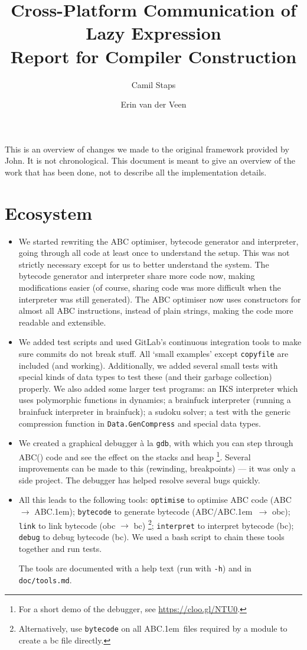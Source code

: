 \documentclass[a4paper]{article}
\title{Cross-Platform Communication of Lazy Expression\\\Large{Report for Compiler Construction}}
\author{Camil Staps \and Erin van der Veen}
\newcommand{\abcstar}{\raisebox{1pt}{$\star$}}
\newcommand{\abcs}{ABC\kern .1em\abcstar}
\begin{document}
\maketitle

This is an overview of changes we made to the original framework provided by John.
It is not chronological.
This document is meant to give an overview of the work that has been done, not to describe all the implementation details.

\section*{Ecosystem}
\begin{itemize}
	\item
		We started rewriting the ABC optimiser, bytecode generator and interpreter,
			going through all code at least once to understand the setup.
		This was not strictly necessary except for us to better understand the system.
		The bytecode generator and interpreter share more code now, making modifications easier
			(of course, sharing code was more difficult when the interpreter was still generated).
		The ABC optimiser now uses constructors for almost all ABC instructions, instead of plain strings,
			making the code more readable and extensible.

	\item
		We added test scripts and used GitLab's continuous integration tools to make sure commits do not break stuff.
		All `small examples' except \texttt{copyfile} are included (and working).
		Additionally, we added several small tests with special kinds of data types to test these (and their garbage collection) properly.
		We also added some larger test programs:
			an IKS interpreter which uses polymorphic functions in dynamics;
			a brainfuck interpreter (running a brainfuck interpreter in brainfuck);
			a sudoku solver;
			a test with the generic compression function in \texttt{Data.GenCompress} and special data types.

	\item
		We created a graphical debugger \`a la \texttt{gdb}, with which you can step through ABC(\abcstar) code and see the effect on the stacks and heap%
			\footnote{For a short demo of the debugger, see \url{https://cloo.gl/NTU0}.}.
		Several improvements can be made to this (rewinding, breakpoints) --- it was only a side project.
		The debugger has helped resolve several bugs quickly.

	\item
		All this leads to the following tools:
		\texttt{optimise} to optimise ABC code (ABC $\to$ \abcs);
		\texttt{bytecode} to generate bytecode (ABC/\abcs\ $\to$ obc);
		\texttt{link} to link bytecode (obc $\to$ bc)%
			\footnote{Alternatively, use \texttt{bytecode} on all \abcs\ files required by a module to create a bc file directly.};
		\texttt{interpret} to interpret bytecode (bc);
		\texttt{debug} to debug bytecode (bc).
		We used a bash script to chain these tools together and run tests.

		The tools are documented with a help text (run with \texttt{-h}) and in \texttt{doc/tools.md}.
\end{itemize}
\end{document}
